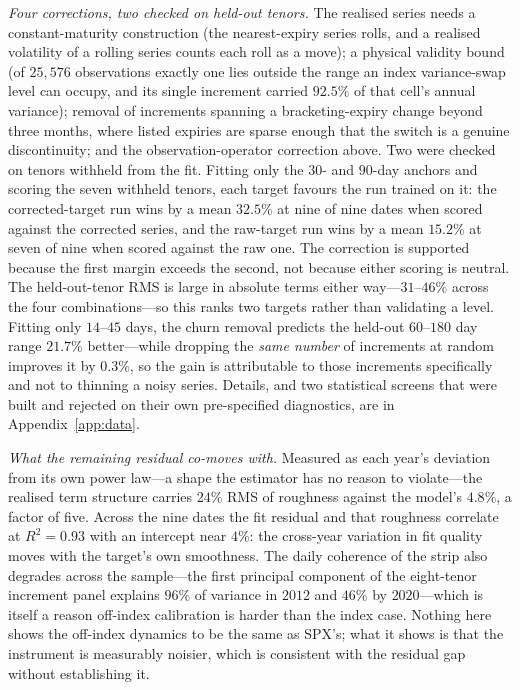 \documentclass[11pt]{article}
\providecommand{\1}{\mathbf 1}
\begin{document}
\emph{Four corrections, two checked on held-out tenors.} The realised series needs a constant-maturity
construction (the nearest-expiry series rolls, and a realised volatility of a rolling series counts
each roll as a move); a physical validity bound (of $25{,}576$ observations exactly one lies outside
the range an index variance-swap level can occupy, and its single increment carried $92.5\%$ of that
cell's annual variance); removal of increments spanning a bracketing-expiry change beyond three
months, where listed expiries are sparse enough that the switch is a genuine discontinuity; and the
observation-operator correction above. Two were checked on tenors withheld from the fit. Fitting
only the $30$- and $90$-day anchors and scoring the seven withheld tenors, each target favours the
run trained on it: the corrected-target run wins by a mean $32.5\%$ at nine of nine dates when
scored against the corrected series, and the raw-target run wins by a mean $15.2\%$ at seven of nine
when scored against the raw one. The correction is supported because the first margin exceeds the
second, not because either scoring is neutral. The held-out-tenor RMS is large in absolute terms
either way---$31$--$46\%$ across the four combinations---so this ranks two targets rather than
validating a level. Fitting only $14$--$45$ days, the churn removal predicts the
held-out $60$--$180$ day range $21.7\%$ better---while dropping the \emph{same number} of increments
at random improves it by $0.3\%$, so the gain is attributable to those increments specifically and
not to thinning a noisy series. Details, and two statistical screens that were built and rejected on
their own pre-specified diagnostics, are in Appendix~\ref{app:data}.

\emph{What the remaining residual co-moves with.} Measured as each year's
deviation from its own power law---a shape the estimator has no reason to violate---the realised term
structure carries $24\%$ RMS of roughness against the model's $4.8\%$, a factor of five. Across the
nine dates the fit residual and that roughness correlate at $R^2=0.93$ with an intercept near $4\%$:
the cross-year variation in fit quality moves with the target's own smoothness. The
daily coherence of the strip also degrades across the sample---the first principal component of the
eight-tenor increment panel explains $96\%$ of variance in $2012$ and $46\%$ by $2020$---which is
itself a reason off-index calibration is harder than the index case. Nothing here shows the
off-index dynamics to be the same as SPX's; what it shows is that the instrument is measurably
noisier, which is consistent with the residual gap without establishing it.
\end{document}
